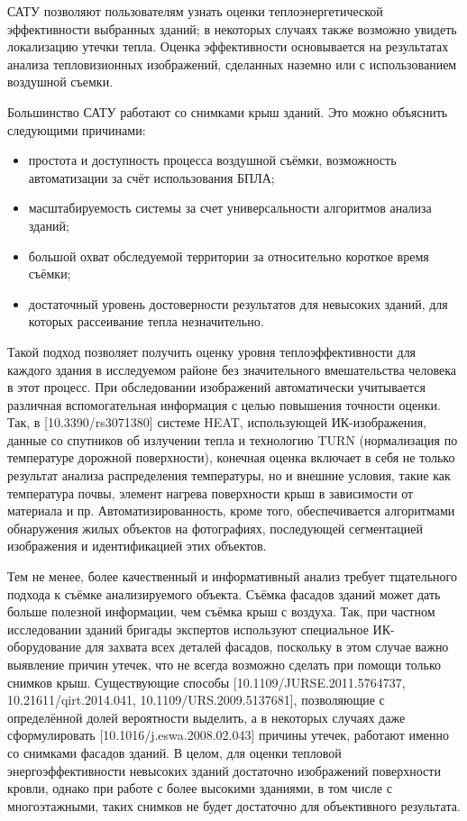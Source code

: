 	САТУ позволяют пользователям узнать оценки теплоэнергетической эффективности выбранных зданий; в некоторых случаях также возможно увидеть локализацию утечки тепла. Оценка эффективности основывается на результатах анализа тепловизионных изображений, сделанных наземно или с использованием воздушной съемки.
	
	Большинство САТУ работают со снимками крыш зданий. Это можно объяснить следующими причинами:
	\begin{itemize}
		\item простота и доступность процесса воздушной съёмки, возможность автоматизации за счёт использования БПЛА;
		\item масштабируемость системы за счет универсальности алгоритмов анализа зданий;
		\item большой охват обследуемой территории за относительно короткое время съёмки;
		\item достаточный уровень достоверности результатов для невысоких зданий, для которых рассеивание тепла незначительно.
	\end{itemize}

	Такой подход позволяет получить оценку уровня теплоэффективности для каждого здания в исследуемом районе без значительного вмешательства человека в этот процесс. При обследовании изображений автоматически учитывается различная вспомогательная информация с целью повышения точности оценки. Так, в [10.3390/rs3071380] системе HEAT, использующей ИК-изображения, данные со спутников об излучении тепла и технологию {TURN} (нормализация по температуре дорожной поверхности), конечная оценка включает в себя не только результат анализа распределения температуры, но и внешние условия, такие как температура почвы, элемент нагрева поверхности крыш в зависимости от материала и пр. Автоматизированность, кроме того, обеспечивается алгоритмами обнаружения жилых объектов на фотографиях, последующей сегментацией изображения и идентификацией этих объектов.

	Тем не менее, более качественный и информативный анализ требует тщательного подхода к съёмке анализируемого объекта. Съёмка фасадов зданий может дать больше полезной информации, чем съёмка крыш с воздуха. Так, при частном исследовании зданий бригады экспертов используют специальное ИК-оборудование для захвата всех деталей фасадов, поскольку в этом случае важно выявление причин утечек, что не всегда возможно сделать при помощи только снимков крыш. Существующие способы [10.1109/JURSE.2011.5764737, 10.21611/qirt.2014.041, 10.1109/URS.2009.5137681], позволяющие с определённой долей вероятности выделить, а в некоторых случаях даже сформулировать [10.1016/j.eswa.2008.02.043] причины утечек, работают именно со снимками фасадов зданий. В целом, для оценки тепловой энергоэффективности невысоких зданий достаточно изображений поверхности кровли, однако при работе с более высокими зданиями, в том числе с многоэтажными, таких снимков не будет достаточно для объективного результата. 

